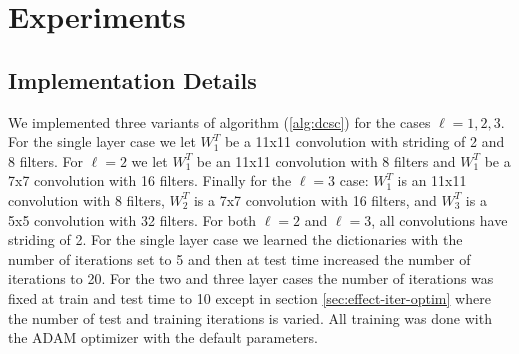 \section{Experiments}

\subsection{Implementation Details}
\label{sec:impl-deta}

We implemented three variants of algorithm (\ref{alg:dcsc}) for the cases $\ell = 1,2,3$. For the single layer case we let $W^T_1$ be a 11x11 convolution with striding of 2 and 8 filters. For $\ell = 2$ we let $W^T_{1}$ be an 11x11 convolution with 8 filters and $W^T_{1}$ be a 7x7 convolution with 16 filters. Finally for the $\ell = 3$ case: $W^T_{1}$ is an 11x11 convolution with 8 filters, $W^T_{2}$ is a 7x7 convolution with 16 filters, and $W^T_{3}$ is a 5x5 convolution with 32 filters. For both $\ell = 2$ and $\ell = 3$, all convolutions have striding of 2. For the single layer case we learned the dictionaries with the number of iterations set to 5 and then at test time increased the number of iterations to 20. For the two and three layer cases the number of iterations was fixed at train and test time to 10 except in section \ref{sec:effect-iter-optim} where the number of test and training iterations is varied. All training was done with the ADAM optimizer with the default parameters.
